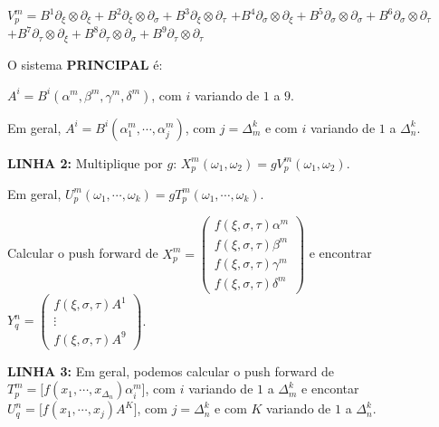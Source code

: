 \documentclass[10pt,a4paper]{article}
\begin{document}
		\vspace{3mm}

		$V_p^m = B^1 \partial_\xi \otimes \partial_\xi + B^2 \partial_\xi \otimes \partial_\sigma + B^3 \partial_\xi \otimes \partial_\tau $
		$+ B^4 \partial_\sigma \otimes \partial_\xi + B^5 \partial_\sigma \otimes \partial_\sigma + B^6 \partial_\sigma \otimes \partial_\tau $
		$+ B^7 \partial_\tau \otimes \partial_\xi + B^8 \partial_\tau \otimes \partial_\sigma + B^9 \partial_\tau \otimes \partial_\tau $

		\vspace{3mm}

		O sistema \textbf{PRINCIPAL} \'e:

		$A^i = B^i(\alpha^m, \beta^m, \gamma^m, \delta^m)$, com $i$ variando de $1$ a $9$.

		\vspace{3mm}

		Em geral, $A^i = B^i(\alpha_1^m, \cdots, \alpha_j^m)$, com $j = \Delta_m^k$ e com $i$ variando de $1$ a $\Delta_n^k$.

		\vspace{3mm}

		\textbf{LINHA 2:} Multiplique por $g$: $X_p^m(\omega_1, \omega_2) = g V_p^m(\omega_1, \omega_2)$.

		Em geral, $U_p^m(\omega_1, \cdots, \omega_k) = g T_p^m(\omega_1, \cdots, \omega_k)$.

		\vspace{3mm}

		Calcular o push forward de $X_p^m = \left( \begin{matrix} f(\xi, \sigma, \tau) \alpha^m \\ f(\xi, \sigma, \tau) \beta^m \\ f(\xi, \sigma, \tau) \gamma^m \\ f(\xi, \sigma, \tau) \delta^m \end{matrix} \right)$ e encontrar $Y_q^n = \left( \begin{matrix} f(\xi, \sigma, \tau) A^1 \\ \vdots \\  f(\xi, \sigma, \tau) A^9 \end{matrix} \right)$.

		\textbf{LINHA 3:} Em geral, podemos calcular o push forward de $T_p^m = \bigg[ f(x_1, \cdots, x_{\Delta_n}) \alpha_i^m \bigg]$, com $i$ variando de $1$ a $\Delta_m^k$ e encontar $U_q^n = \bigg[ f(x_1, \cdots, x_j) A^K \bigg]$, com $j = \Delta_n^k$ e com $K$ variando de $1$ a $\Delta_n^k$.
\end{document}
